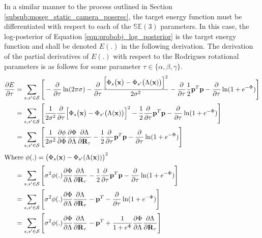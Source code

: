 In a similar manner to the process outlined in Section
\ref{subsub:moseg_static_camera_poserec}, the target energy function must be
differentiated with respect to each of the $\mathbb{SE}(3)$ parameters. In this
case, the log-posterior of Equation \ref{eqn:probobj_log_posterior} is the
target energy function and shall be denoted $E(.)$ in the following derivation.
The derivation of the partial derivatives of $E(.)$ with respect
to the Rodrigues rotational parameters is as follows for some parameter
$\tau \in \{\alpha, \beta, \gamma\}$.
\begin{align}
  \label{eqn:probobj_log_post_rot_grad}
  \frac{\partial E}{\partial \tau} &=
  \sum_{s, s' \in \mathcal{S}} \Bigg[ - \frac{\partial}{\partial \tau}
  \ln(2\pi\sigma) - \frac{\partial}{\partial \tau}
  \frac{\Big[\Phi_{s}\big(\mathbf{x}\big) -
  \Phi_{s'}\big(\Lambda(\mathbf{x})\big)\Big]^{2}}{2\sigma^{2}} -
  \frac{\partial}{\partial \tau} \frac{1}{2} \mathbf{p}^{T}\mathbf{p} -
  \frac{\partial}{\partial \tau} \ln(1 + e^{-\Phi})
  \Bigg]\\
  &= \sum_{s, s' \in \mathcal{S}} \Bigg[ \frac{1}{2\sigma^{2}}
  \frac{\partial}{\partial \tau}
  \Big[\Phi_{s}\big(\mathbf{x}\big) - \Phi_{s'}\big(\Lambda(\mathbf{x})\big)\Big]^{2} -
  \frac{1}{2} \frac{\partial}{\partial \tau}
  \mathbf{p}^{T}\mathbf{p} - \frac{\partial}{\partial \tau} \ln(1 + e^{-\Phi})
  \Bigg]\\
  &= \sum_{s, s' \in \mathcal{S}} \Bigg[ \frac{1}{2\sigma^{2}}
  \frac{\partial \phi}{\partial \Phi} \frac{\partial \Phi}{\partial \Lambda}
  \frac{\partial \Lambda}{\partial \mathbf{R}_{\tau}} -
  \frac{1}{2} \frac{\partial}{\partial \tau}
  \mathbf{p}^{T}\mathbf{p} - \frac{\partial}{\partial \tau} \ln(1 + e^{-\Phi})
  \Bigg]\\
  \shortintertext{Where $\phi(.) =
  \big(\Phi_{s}(\mathbf{x}) - \Phi_{s'}(\Lambda(\mathbf{x}))\big)^{2}$}
  &= \sum_{s, s' \in \mathcal{S}} \Bigg[ \sigma^{2} \phi(.)
  \frac{\partial \Phi}{\partial \Lambda}
  \frac{\partial \Lambda}{\partial \mathbf{R}_{\tau}} -
  \frac{1}{2} \frac{\partial}{\partial \tau}
  \mathbf{p}^{T}\mathbf{p} - \frac{\partial}{\partial \tau} \ln(1 + e^{-\Phi})
  \Bigg]\\
  &= \sum_{s, s' \in \mathcal{S}} \Bigg[ \sigma^{2} \phi(.)
  \frac{\partial \Phi}{\partial \Lambda}
  \frac{\partial \Lambda}{\partial \mathbf{R}_{\tau}} - \mathbf{p}^{T} -
  \frac{\partial}{\partial \tau} \ln(1 + e^{-\Phi})
    \Bigg]\\
  &= \sum_{s, s' \in \mathcal{S}} \Bigg[ \sigma^{2} \phi(.)
  \frac{\partial \Phi}{\partial \Lambda}
  \frac{\partial \Lambda}{\partial \mathbf{R}_{\tau}} - \mathbf{p}^{T} +
  \frac{1}{1 + e^{\Phi}} \frac{\partial \Phi}{\partial \Lambda}
  \frac{\partial \Lambda}{\partial \mathbf{R}_{\tau}} \Bigg]
\end{align}

